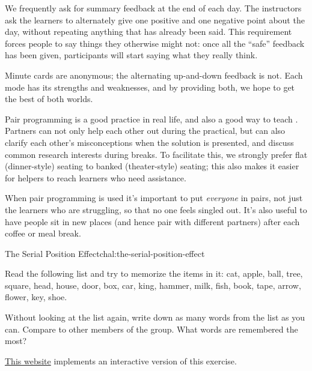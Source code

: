 

We frequently ask for summary feedback at the end of each day. The
instructors ask the learners to alternately give one positive and one
negative point about the day, without repeating anything that has
already been said. This requirement forces people to say things they
otherwise might not: once all the ``safe'' feedback has been given,
participants will start saying what they really think.

Minute cards are anonymous; the alternating up-and-down feedback is not.
Each mode has its strengths and weaknesses, and by providing both, we
hope to get the best of both worlds.


Pair programming is a good practice in real life, and also a good way
to teach \cite{bib:porter-what-works}. Partners can not only help each
other out during the practical, but can also clarify each other's
misconceptions when the solution is presented, and discuss common
research interests during breaks. To facilitate this, we strongly
prefer flat (dinner-style) seating to banked (theater-style) seating;
this also makes it easier for helpers to reach learners who need
assistance.

When pair programming is used it's important to put \emph{everyone} in
pairs, not just the learners who are struggling, so that no one feels
singled out. It's also useful to have people sit in new places (and
hence pair with different partners) after each coffee or meal break.


\begin{challenge}{The Serial Position Effect}{chal:the-serial-position-effect}

Read the following list and try to memorize the items in it: cat,
apple, ball, tree, square, head, house, door, box, car, king, hammer,
milk, fish, book, tape, arrow, flower, key, shoe.

Without looking at the list again, write down as many words from the
list as you can. Compare to other members of the group. What words are
remembered the most?

\href{http://cat.xula.edu/thinker/memory/working/serial}{This website}
implements an interactive version of this exercise.

\end{challenge}

